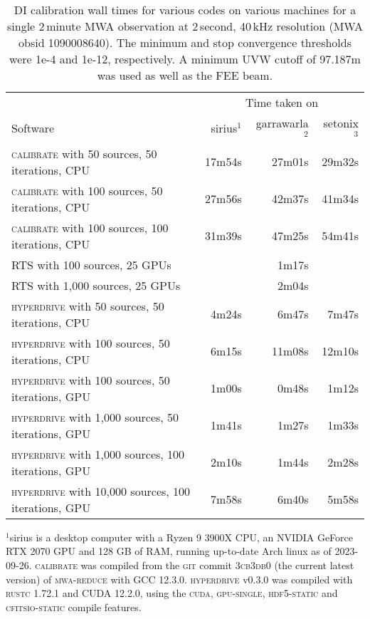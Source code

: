 \documentclass[summary]{ursi}
\newcommand{\hyperdrive}{\textsc{hyperdrive}}\newcommand{\mwalib}{\textsc{mwalib}}
\newcommand{\rts}{\textsc{RTS}}
\newcommand{\mwareduce}{\textsc{mwa-reduce}}
\newcommand{\calibrate}{\textsc{calibrate}}
\begin{document}
\begin{table*}[ht]
  \begin{center}
  \caption{DI calibration wall times for various codes on various machines for a single
2\,minute MWA observation at 2\,second, 40\,kHz resolution (MWA obsid
1090008640). The minimum and stop convergence thresholds were 1e-4 and 1e-12,
respectively. A minimum UVW cutoff of 97.187m was used as well as the FEE beam.}
  \label{tab:perf}
  \begin{tabular}{ |l|rrr| }
    \hline
                                                           & \multicolumn{3}{c}{Time taken on} \\
    Software                                               & sirius$^1$ & garrawarla$^2$ & setonix$^3$ \\
    \hline
    \calibrate{} with 50 sources, 50 iterations, CPU       & 17m54s     & 27m01s         & 29m32s \\
    \calibrate{} with 100 sources, 50 iterations, CPU      & 27m56s     & 42m37s         & 41m34s \\
    \calibrate{} with 100 sources, 100 iterations, CPU     & 31m39s     & 47m25s         & 54m41s \\
    \hline
    \rts{} with 100 sources, 25 GPUs                       &            & 1m17s          & \\
    \rts{} with 1,000 sources, 25 GPUs                     &            & 2m04s          & \\
    \hline
    \hyperdrive{} with 50 sources, 50 iterations, CPU      & 4m24s      & 6m47s          & 7m47s \\
    \hyperdrive{} with 100 sources, 50 iterations, CPU     & 6m15s      & 11m08s         & 12m10s \\
    \hyperdrive{} with 100 sources, 50 iterations, GPU     & 1m00s      & 0m48s          & 1m12s \\
    \hyperdrive{} with 1,000 sources, 50 iterations, GPU   & 1m41s      & 1m27s          & 1m33s \\
    \hyperdrive{} with 1,000 sources, 100 iterations, GPU  & 2m10s      & 1m44s          & 2m28s \\
    \hyperdrive{} with 10,000 sources, 100 iterations, GPU & 7m58s      & 6m40s          & 5m58s \\
    \hline
  \end{tabular}
 \flushleft $^1$sirius is a desktop computer with a Ryzen 9 3900X CPU, an
  NVIDIA GeForce RTX 2070 GPU and 128 GB of RAM, running up-to-date Arch
  linux as of 2023-09-26. \calibrate{} was compiled from the \textsc{git}
  commit \textsc{3cb3db0} (the current latest version) of \mwareduce{} with
  \textsc{GCC} 12.3.0. \hyperdrive{} v0.3.0 was compiled with \textsc{rustc}
  1.72.1 and \textsc{CUDA} 12.2.0, using the \textsc{cuda}, \textsc{gpu-single},
  \textsc{hdf5-static} and \textsc{cfitsio-static} compile features.


\end{center}
\end{table*}
\end{document}
